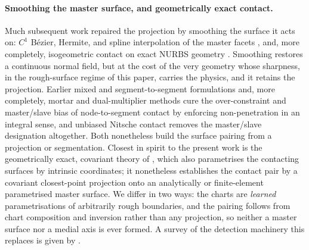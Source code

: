 \documentclass{svjour3}                 %
\begin{document}
\paragraph{Smoothing the master surface, and geometrically exact contact.}
Much subsequent work repaired the projection by smoothing the surface it acts on: $C^1$ B\'ezier, Hermite, and
spline interpolation of the master facets \citep{wriggers2001smooth}, and, more completely, isogeometric
contact on exact NURBS geometry \citep{temizer2011contact,delorenzis2014review}. Smoothing restores a
continuous normal field, but at the cost of the very geometry whose sharpness, in the rough-surface
regime of this paper, carries the physics, and it retains the projection. Earlier mixed and
segment-to-segment formulations \citep{simo1985perturbed,zavarise1998segment} and, more completely, mortar and
dual-multiplier methods \citep{puso2004segment,popp2009finite,hueber2005primaldual} cure the over-constraint
and master/slave bias of node-to-segment contact by enforcing non-penetration in an integral sense, and
unbiased Nitsche contact
\citep{mlika2017unbiased} removes the master/slave designation altogether. Both nonetheless build the surface
pairing from a projection or segmentation. Closest in spirit to the present work is the geometrically exact,
covariant theory of \citet{konyukhov2013computational}, which also parametrises the contacting surfaces by
intrinsic coordinates; it nonetheless establishes the contact pair by a covariant closest-point projection onto
an analytically or finite-element parametrised master surface. We differ in two ways: the charts are
\emph{learned} parametrisations of arbitrarily rough boundaries, and the pairing follows from chart composition
and inversion rather than any projection, so neither a master surface nor a medial axis is ever formed. A
survey of the detection machinery this replaces is given by \citet{yastrebov2013numerical}.
\end{document}
